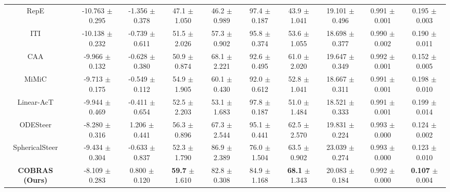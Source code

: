 \begin{table}[t]
{\begin{tabular}{cc|
c c >{\columncolor{lightpurple!25}}c|
c c >{\columncolor{lightpurple!25}}c|
c c >{\columncolor{lightpurple!25}}c}
RepE &  & -10.763 {\tiny $\pm$ 0.295} & -1.356 {\tiny $\pm$ 0.378} & 47.1 {\tiny $\pm$ 1.050} & 46.2 {\tiny $\pm$ 0.989} & 97.4 {\tiny $\pm$ 0.187} & 43.9 {\tiny $\pm$ 1.041} & 19.101 {\tiny $\pm$ 0.496} & 0.991 {\tiny $\pm$ 0.001} & 0.195 {\tiny $\pm$ 0.003} \\

ITI &  & -10.138 {\tiny $\pm$ 0.232} & -0.739 {\tiny $\pm$ 0.611} & 51.5 {\tiny $\pm$ 2.026} & 57.3 {\tiny $\pm$ 0.902} & 95.8 {\tiny $\pm$ 0.374} & 53.6 {\tiny $\pm$ 1.055} & 18.698 {\tiny $\pm$ 0.377} & 0.990 {\tiny $\pm$ 0.002} & 0.190 {\tiny $\pm$ 0.011} \\

CAA &  & -9.966 {\tiny $\pm$ 0.132} & -0.628 {\tiny $\pm$ 0.380} & 50.9 {\tiny $\pm$ 0.874} & 68.1 {\tiny $\pm$ 2.221} & 92.6 {\tiny $\pm$ 0.495} & 61.0 {\tiny $\pm$ 2.020} & 19.647 {\tiny $\pm$ 0.349} & 0.992 {\tiny $\pm$ 0.001} & 0.152 {\tiny $\pm$ 0.005} \\

MiMiC &  & -9.713 {\tiny $\pm$ 0.175} & -0.549 {\tiny $\pm$ 0.112} & 54.9 {\tiny $\pm$ 1.905} & 60.1 {\tiny $\pm$ 0.430} & 92.0 {\tiny $\pm$ 0.612} & 52.8 {\tiny $\pm$ 1.041} & 18.667 {\tiny $\pm$ 0.311} & 0.991 {\tiny $\pm$ 0.001} & 0.198 {\tiny $\pm$ 0.010} \\

Linear-AcT &  & -9.944 {\tiny $\pm$ 0.469} & -0.411 {\tiny $\pm$ 0.654} & 52.5 {\tiny $\pm$ 2.203} & 53.1 {\tiny $\pm$ 1.683} & 97.8 {\tiny $\pm$ 0.187} & 51.0 {\tiny $\pm$ 1.484} & 18.521 {\tiny $\pm$ 0.333} & 0.991 {\tiny $\pm$ 0.001} & 0.199 {\tiny $\pm$ 0.014} \\

ODESteer &  & -8.280 {\tiny $\pm$ 0.316} & 1.206 {\tiny $\pm$ 0.441} & 56.3 {\tiny $\pm$ 0.896} & 67.3 {\tiny $\pm$ 2.544} & 95.1 {\tiny $\pm$ 0.441} & 62.5 {\tiny $\pm$ 2.570} & 19.831 {\tiny $\pm$ 0.224} & 0.993 {\tiny $\pm$ 0.000} & 0.124 {\tiny $\pm$ 0.002} \\

SphericalSteer &  & -9.434 {\tiny $\pm$ 0.304} & -0.633 {\tiny $\pm$ 0.837} & 52.3 {\tiny $\pm$ 1.790} & 86.9 {\tiny $\pm$ 2.389} & 76.0 {\tiny $\pm$ 1.504} & 63.5 {\tiny $\pm$ 0.902} & 23.039 {\tiny $\pm$ 0.274} & 0.993 {\tiny $\pm$ 0.000} & 0.123 {\tiny $\pm$ 0.010} \\

\midrule

\rowcolor{cobrasblue}\textbf{COBRAS (Ours)} &  & -8.109 {\tiny $\pm$ 0.283} & 0.800 {\tiny $\pm$ 0.120} & \textbf{59.7} {\tiny $\pm$ 1.610} & 82.8 {\tiny $\pm$ 0.308} & 84.9 {\tiny $\pm$ 1.168} & \textbf{68.1} {\tiny $\pm$ 1.343} & 20.083 {\tiny $\pm$ 0.184} & 0.992 {\tiny $\pm$ 0.000} & \textbf{0.107} {\tiny $\pm$ 0.004} \\


\end{tabular}}
\end{table}
